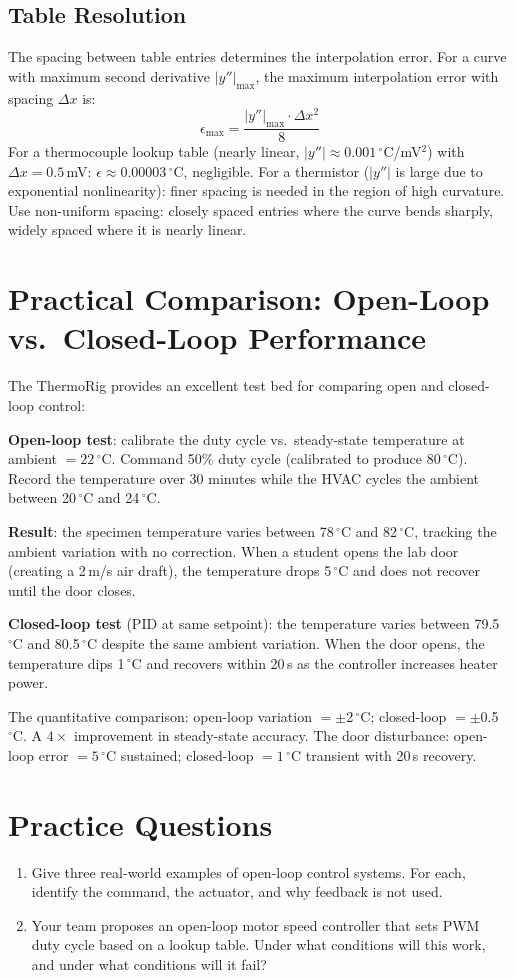 \documentclass[11pt,letterpaper,twoside,openany]{book}
\newcommand{\degC}{\ensuremath{{}^{\circ}\text{C}}}
\begin{document}
\subsection{Table Resolution}
The spacing between table entries determines the interpolation error. For a curve with maximum second derivative $|y''|_{\max}$, the maximum interpolation error with spacing $\Delta x$ is:
\begin{equation}
\epsilon_{\max} = \frac{|y''|_{\max} \cdot \Delta x^2}{8}
\end{equation}
For a thermocouple lookup table (nearly linear, $|y''| \approx 0.001$\,\degC{}/mV$^2$) with $\Delta x = 0.5$\,mV: $\epsilon \approx 0.00003$\,\degC{}, negligible. For a thermistor ($|y''|$ is large due to exponential nonlinearity): finer spacing is needed in the region of high curvature. Use non-uniform spacing: closely spaced entries where the curve bends sharply, widely spaced where it is nearly linear.

\section{Practical Comparison: Open-Loop vs.\ Closed-Loop Performance}
The ThermoRig provides an excellent test bed for comparing open and closed-loop control:

\textbf{Open-loop test}: calibrate the duty cycle vs.\ steady-state temperature at ambient $= 22$\,\degC{}. Command 50\% duty cycle (calibrated to produce 80\,\degC{}). Record the temperature over 30 minutes while the HVAC cycles the ambient between 20\,\degC{} and 24\,\degC{}.

\textbf{Result}: the specimen temperature varies between 78\,\degC{} and 82\,\degC{}, tracking the ambient variation with no correction. When a student opens the lab door (creating a 2\,m/s air draft), the temperature drops 5\,\degC{} and does not recover until the door closes.

\textbf{Closed-loop test} (PID at same setpoint): the temperature varies between 79.5\,\degC{} and 80.5\,\degC{} despite the same ambient variation. When the door opens, the temperature dips 1\,\degC{} and recovers within 20\,s as the controller increases heater power.

The quantitative comparison: open-loop variation $= \pm$2\,\degC{}; closed-loop $= \pm$0.5\,\degC{}. A $4\times$ improvement in steady-state accuracy. The door disturbance: open-loop error $= 5$\,\degC{} sustained; closed-loop $= 1$\,\degC{} transient with 20\,s recovery.
\section{Practice Questions}
\begin{enumerate}[leftmargin=1.5em]
\item Give three real-world examples of open-loop control systems. For each, identify the command, the actuator, and why feedback is not used.
\item Your team proposes an open-loop motor speed controller that sets PWM duty cycle based on a lookup table. Under what conditions will this work, and under what conditions will it fail?
\end{enumerate}
\end{document}
